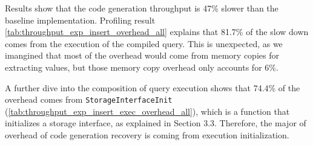 \documentclass[12pt]{cmuthesis}
\begin{document}
\begin{table}[H]
\begin{center}
\caption{\textbf{Callgrind breakdown on the Query Execution step of an Insert Replay step}.}
\label{tab:throughput_exp_insert_exec_overhead_all}
\end{center}
\end{table}
Results show that the code generation throughput is 47\% slower than the baseline implementation. Profiling result \cref{tab:throughput_exp_insert_overhead_all} explains that 81.7\% of the slow down comes from the execution of the compiled query. This is unexpected, as we imangined that most of the overhead would come from memory copies for extracting values, but those memory copy overhead only accounts for 6\%.

A further dive into the composition of query execution shows that 74.4\% of the overhead comes from \texttt{StorageInterfaceInit} (\cref{tab:throughput_exp_insert_exec_overhead_all}), which is a function that initializes a storage interface, as explained in Section 3.3. Therefore, the major of overhead of code generation recovery is coming from execution initialization.
\end{document}

